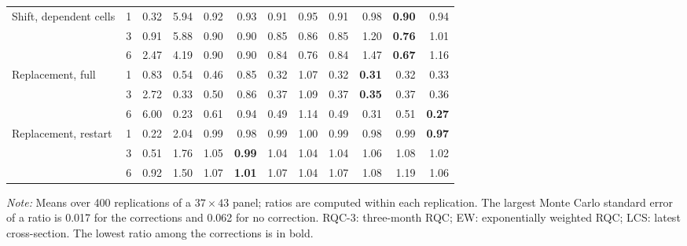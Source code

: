 \begin{table}[t]
\begin{tabular*}{\textwidth}{@{\extracolsep\fill}lc rr rrrrrrrr@{}}
\addlinespace
Shift, dependent cells & 1 & 0.32 & 5.94 & 0.92 & 0.93 & 0.91 & 0.95 & 0.91 & 0.98 & \textbf{0.90} & 0.94 \\
 & 3 & 0.91 & 5.88 & 0.90 & 0.90 & 0.85 & 0.86 & 0.85 & 1.20 & \textbf{0.76} & 1.01 \\
 & 6 & 2.47 & 4.19 & 0.90 & 0.90 & 0.84 & 0.76 & 0.84 & 1.47 & \textbf{0.67} & 1.16 \\
\addlinespace
Replacement, full & 1 & 0.83 & 0.54 & 0.46 & 0.85 & 0.32 & 1.07 & 0.32 & \textbf{0.31} & 0.32 & 0.33 \\
 & 3 & 2.72 & 0.33 & 0.50 & 0.86 & 0.37 & 1.09 & 0.37 & \textbf{0.35} & 0.37 & 0.36 \\
 & 6 & 6.00 & 0.23 & 0.61 & 0.94 & 0.49 & 1.14 & 0.49 & 0.31 & 0.51 & \textbf{0.27} \\
\addlinespace
Replacement, restart & 1 & 0.22 & 2.04 & 0.99 & 0.98 & 0.99 & 1.00 & 0.99 & 0.98 & 0.99 & \textbf{0.97} \\
 & 3 & 0.51 & 1.76 & 1.05 & \textbf{0.99} & 1.04 & 1.04 & 1.04 & 1.06 & 1.08 & 1.02 \\
 & 6 & 0.92 & 1.50 & 1.07 & \textbf{1.01} & 1.07 & 1.04 & 1.07 & 1.08 & 1.19 & 1.06 \\
\bottomrule
\end{tabular*}
\begin{tablenotes}
\item \textit{Note:} Means over 400 replications of a $37\times43$ panel; ratios are computed within each replication. The largest Monte Carlo standard error of a ratio is 0.017 for the corrections and 0.062 for no correction. RQC-3: three-month RQC; EW: exponentially weighted RQC; LCS: latest cross-section. The lowest ratio among the corrections is in bold.
\end{tablenotes}
\end{table}
